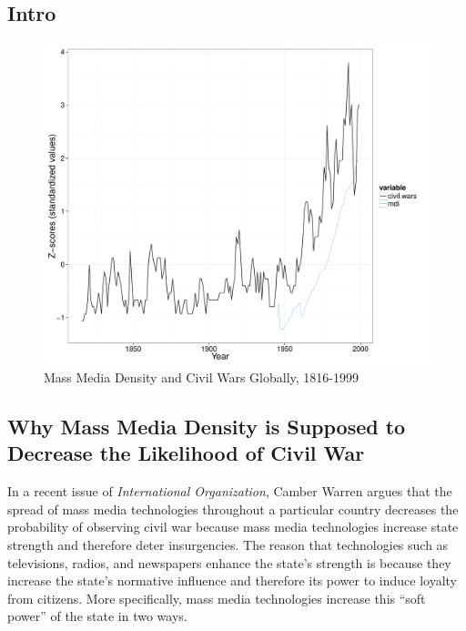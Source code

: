 \documentclass[11pt,article,oneside]{memoir}
\makeatletter
\def\maxwidth{\ifdim\Gin@nat@width>\linewidth\linewidth
\else\Gin@nat@width\fi}
\let\Oldincludegraphics\includegraphics
\renewcommand{\includegraphics}[1]{\Oldincludegraphics[width=\maxwidth]{#1}}
\makeatother
\begin{document}
\subsection{Intro}\label{intro}

\begin{figure}[htbp]
\centering
\includegraphics{figure/globalplot.pdf}
\caption{Mass Media Density and Civil Wars Globally, 1816-1999}
\end{figure}

\subsection{Why Mass Media Density is Supposed to Decrease the
Likelihood of Civil
War}\label{why-mass-media-density-is-supposed-to-decrease-the-likelihood-of-civil-war}

In a recent issue of \emph{International Organization}, Camber Warren
argues that the spread of mass media technologies throughout a
particular country decreases the probability of observing civil war
because mass media technologies increase state strength and therefore
deter insurgencies. The reason that technologies such as televisions,
radios, and newspapers enhance the state's strength is because they
increase the state's normative influence and therefore its power to
induce loyalty from citizens. More specifically, mass media technologies
increase this ``soft power'' of the state in two ways.
\end{document}
